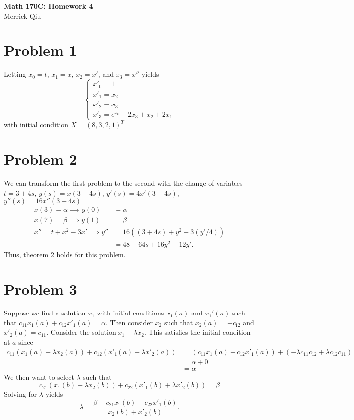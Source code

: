 \documentclass{article}
\begin{document}
\begin{center}
	\huge{\bf Math 170C: Homework 4} \\
	Merrick Qiu
\end{center}
\section*{Problem 1}
Letting $x_0 = t$, $x_1 = x$, $x_2 = x'$, and $x_3 = x''$ yields
\[
	\begin{cases}
		x'_0 = 1 \\
		x'_1 = x_2 \\
		x'_2 = x_3\\
		x'_3 = e^{x_0} -2x_3 + x_2 + 2x_1
	\end{cases}
\]
with initial condition $X = (8, 3,2,1)^T$
\newpage 

\section*{Problem 2}
We can transform the first problem to the second with the change of variables
$t = 3+4s$,  $y(s) = x(3+4s)$, $y'(s) = 4x'(3+4s)$, $y''(s) = 16x''(3+4s)$
\begin{align*}
	x(3) = \alpha \implies y(0) &= \alpha \\
	x(7) = \beta \implies y(1) &= \beta \\
	x'' = t+x^2-3x' \implies y'' &= 16((3+4s)+y^2-3(y'/4)) \\
	&= 48 +64s + 16y^2 - 12 y'.
\end{align*}
Thus, theorem 2 holds for this problem.
\newpage

\section*{Problem 3}
Suppose we find a solution $x_1$ with initial conditions $x_1(a)$ and $x_1'(a)$
such that $c_{11}x_1(a) + c_{12}x'_1(a) = \alpha$.
Then consider $x_2$ such that $x_2(a) = -c_{12}$ and $x'_2(a) = c_{11}$.
Consider the solution $x_1 + \lambda x_2$.
This satisfies the initial condition at $a$ since 
\begin{align*}
	c_{11}(x_1(a) + \lambda x_2(a)) + c_{12}(x'_1(a) + \lambda x'_2(a)) 
	&= (c_{11}x_1(a) + c_{12}x'_1(a)) + (-\lambda c_{11}c_{12} + \lambda c_{12}c_{11}) \\
	&= \alpha + 0 \\
	&= \alpha
\end{align*}
We then want to select $\lambda$ such that 
\[
	c_{21}(x_1(b) + \lambda x_2(b)) + c_{22}(x'_1(b) + \lambda x'_2(b)) = \beta
\]
Solving for $\lambda$ yields 
\[
	\lambda = \frac{\beta - c_{21}x_1(b) - c_{22}x'_1(b)}{x_2(b) + x'_2(b)}.
\]
\end{document}
